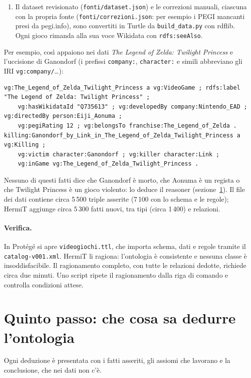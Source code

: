 \documentclass[10pt,a4paper]{article}
\begin{document}
\begin{enumerate}
  \item Il dataset revisionato (\texttt{fonti/dataset.json}) e le correzioni manuali, ciascuna con la propria fonte (\texttt{fonti/correzioni.json}: per esempio i PEGI mancanti presi da pegi.info), sono convertiti in Turtle da \texttt{build\_data.py} con rdflib. Ogni gioco rimanda alla sua voce Wikidata con \texttt{rdfs:seeAlso}.
\end{enumerate}
Per esempio, così appaiono nei dati \emph{The Legend of Zelda: Twilight Princess} e l'uccisione di Ganondorf (i prefissi \texttt{company:}, \texttt{character:} e simili abbreviano gli IRI \texttt{vg:company/}\dots):
\begin{lstlisting}
vg:The_Legend_of_Zelda_Twilight_Princess a vg:VideoGame ; rdfs:label "The Legend of Zelda: Twilight Princess" ;
    vg:hasWikidataId "Q735613" ; vg:developedBy company:Nintendo_EAD ; vg:directedBy person:Eiji_Aonuma ;
    vg:pegiRating 12 ; vg:belongsTo franchise:The_Legend_of_Zelda .
killing:Ganondorf_by_Link_in_The_Legend_of_Zelda_Twilight_Princess a vg:Killing ;
    vg:victim character:Ganondorf ; vg:killer character:Link ;
    vg:inGame vg:The_Legend_of_Zelda_Twilight_Princess .
\end{lstlisting}
Nessuno di questi fatti dice che Ganondorf è morto, che Aonuma è un regista o che Twilight Princess è un gioco violento: lo deduce il reasoner (sezione~\ref{sec:inferenze}). Il file dei dati contiene circa 5\,500 triple asserite (7\,100 con lo schema e le regole); HermiT aggiunge circa 5\,300 fatti nuovi, tra tipi (circa 1\,400) e relazioni.

\paragraph{Verifica.} In Protégé si apre \texttt{videogiochi.ttl}, che importa schema, dati e regole tramite il \texttt{catalog-v001.xml}. HermiT li ragiona: l'ontologia è consistente e nessuna classe è insoddisfacibile. Il ragionamento completo, con tutte le relazioni dedotte, richiede circa due minuti. Uno script ripete il ragionamento dalla riga di comando e controlla \nControlli{} condizioni attese.

\section{Quinto passo: che cosa sa dedurre l'ontologia}\label{sec:inferenze}

Ogni deduzione è presentata con i fatti asseriti, gli assiomi che lavorano e la conclusione, che nei dati non c'è.
\end{document}
